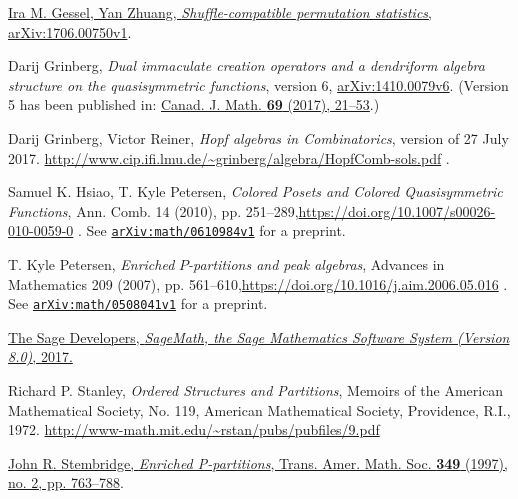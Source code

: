 \documentclass[numbers=enddot,12pt,final,onecolumn,notitlepage]{scrartcl}%
\theoremstyle{definition}
\begin{document}
\begin{thebibliography}{99999999}                                                                                         %


\href{http://arxiv.org/abs/1706.00750v1}{Ira M.
Gessel, Yan Zhuang, \textit{Shuffle-compatible permutation statistics},
arXiv:1706.00750v1}.

Darij Grinberg, \textit{Dual immaculate creation
operators and a dendriform algebra structure on the quasisymmetric functions},
version 6, \href{https://arxiv.org/abs/1410.0079v6}{arXiv:1410.0079v6}.
(Version 5 has been published in:
\href{https://cms.math.ca/10.4153/CJM-2016-018-8?abfmt=ltx}{Canad. J. Math.
\textbf{69} (2017), 21--53}.)

Darij Grinberg, Victor Reiner, \textit{Hopf
algebras in Combinatorics}, version of 27 July 2017. \newline%
\url{http://www.cip.ifi.lmu.de/~grinberg/algebra/HopfComb-sols.pdf} .

Samuel K. Hsiao, T. Kyle Petersen, \textit{Colored
Posets and Colored Quasisymmetric Functions}, Ann. Comb. 14 (2010), pp.
251--289,\newline\url{https://doi.org/10.1007/s00026-010-0059-0} . See
\href{http://www.arxiv.org/abs/math/0610984v1}{\texttt{arXiv:math/0610984v1}}
for a preprint.

T. Kyle Petersen, \textit{Enriched }$\mathit{P}%
$\textit{-partitions and peak algebras}, Advances in Mathematics 209 (2007),
pp. 561--610,\newline\url{https://doi.org/10.1016/j.aim.2006.05.016} . See
\texttt{\href{https://arxiv.org/abs/math/0508041v1}{arXiv:math/0508041v1}} for
a preprint.

\href{http://www.sagemath.org}{The Sage
Developers, \textit{SageMath, the Sage Mathematics Software System (Version
8.0)}, 2017.}

Richard P. Stanley, \textit{Ordered Structures and
Partitions}, Memoirs of the American Mathematical Society, No. 119, American
Mathematical Society, Providence, R.I., 1972. \newline\url{http://www-math.mit.edu/~rstan/pubs/pubfiles/9.pdf}

%
\href{http://www.ams.org/journals/tran/1997-349-02/S0002-9947-97-01804-7/}{John
R. Stembridge, \textit{Enriched P-partitions}, Trans. Amer. Math. Soc.
\textbf{349} (1997), no. 2, pp. 763--788}.
\end{thebibliography}
\end{document}

